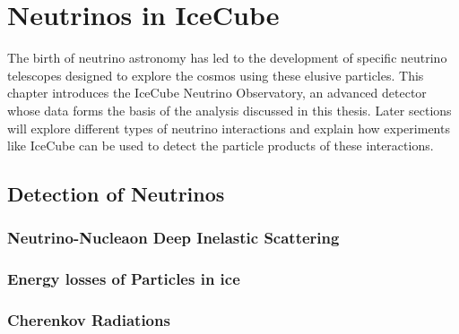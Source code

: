 \setchapterpreamble[u]{\margintoc}
\chapter{Neutrinos in IceCube} 


The birth of neutrino astronomy has led to the development of specific neutrino telescopes designed to explore the cosmos using these elusive particles. 
This chapter introduces the IceCube Neutrino Observatory, an advanced detector whose data forms the basis of the analysis discussed in this thesis. 
Later sections will explore different types of neutrino interactions and explain how experiments like IceCube can be used to detect the particle products of these interactions.\par 

\section{Detection of Neutrinos} 
\label{sec:nu_detection}

\subsection{Neutrino-Nucleaon Deep Inelastic Scattering}
\subsection{Energy losses of Particles in ice}
\subsection{Cherenkov Radiations}



